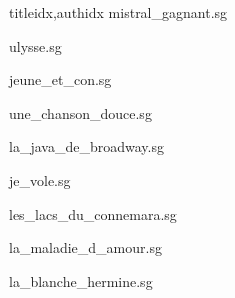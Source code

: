 \documentclass[
    ]{article}
\begin{document}
\begin{songs}{titleidx,authidx}
{mistral_gagnant.sg}


{ulysse.sg}


{jeune_et_con.sg}


{une_chanson_douce.sg}


{la_java_de_broadway.sg}


{je_vole.sg}


{les_lacs_du_connemara.sg}


{la_maladie_d_amour.sg}


{la_blanche_hermine.sg}



\end{songs}
\end{document}
